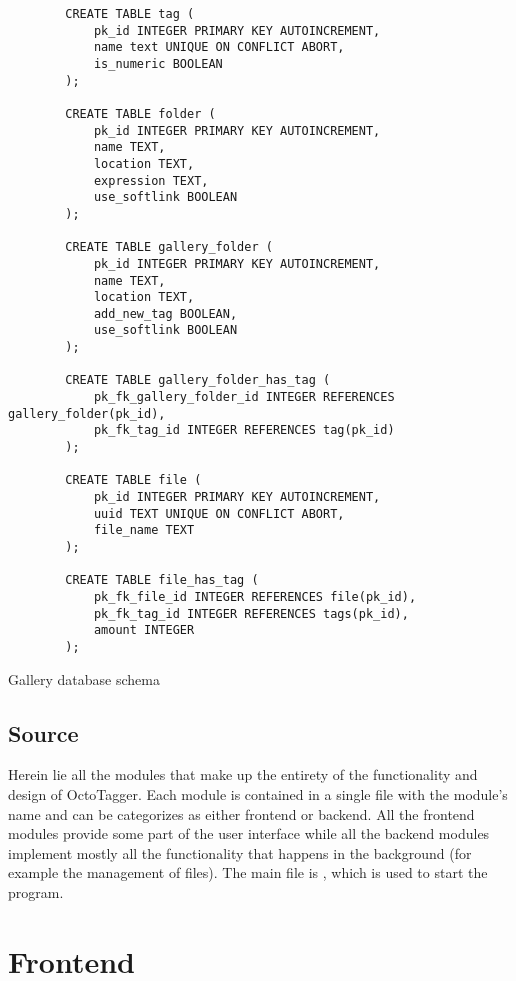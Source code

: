 \begin{listing}[!ht]
	\begin{verbatim}
		CREATE TABLE tag (
			pk_id INTEGER PRIMARY KEY AUTOINCREMENT,
			name text UNIQUE ON CONFLICT ABORT,
			is_numeric BOOLEAN
		);

		CREATE TABLE folder (
			pk_id INTEGER PRIMARY KEY AUTOINCREMENT,
			name TEXT,
			location TEXT,
			expression TEXT,
			use_softlink BOOLEAN
		);

		CREATE TABLE gallery_folder (
			pk_id INTEGER PRIMARY KEY AUTOINCREMENT,
			name TEXT,
			location TEXT,
			add_new_tag BOOLEAN,
			use_softlink BOOLEAN
		);

		CREATE TABLE gallery_folder_has_tag (
			pk_fk_gallery_folder_id INTEGER REFERENCES gallery_folder(pk_id),
			pk_fk_tag_id INTEGER REFERENCES tag(pk_id)
		);

		CREATE TABLE file (
			pk_id INTEGER PRIMARY KEY AUTOINCREMENT,
			uuid TEXT UNIQUE ON CONFLICT ABORT,
			file_name TEXT
		);

		CREATE TABLE file_has_tag (
			pk_fk_file_id INTEGER REFERENCES file(pk_id),
			pk_fk_tag_id INTEGER REFERENCES tags(pk_id),
			amount INTEGER
		);
	\end{verbatim}
	\caption{Gallery database schema}
	\label{lst:db:gallery}
\end{listing}

\subsection{Source}
Herein lie all the modules that make up the entirety of the functionality and
design of OctoTagger. Each module is contained in a single file with the
module's name and can be categorizes as either frontend or backend. All the
frontend modules provide some part of the user interface while all the backend
modules implement mostly all the functionality that happens in the background
(for example the management of files). The main file is ,
which is used to start the program.



\section{Frontend}
%











